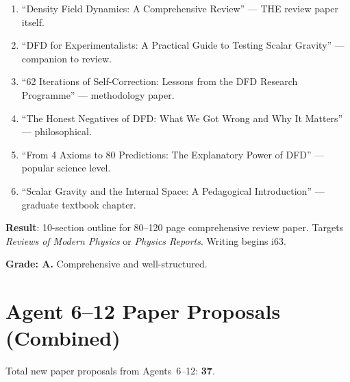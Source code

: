 \documentclass[11pt,a4paper]{article}
\begin{document}
\begin{enumerate}
\item ``Density Field Dynamics: A Comprehensive Review'' --- THE review paper itself.
\item ``DFD for Experimentalists: A Practical Guide to Testing Scalar Gravity'' --- companion to review.
\item ``62 Iterations of Self-Correction: Lessons from the DFD Research Programme'' --- methodology paper.
\item ``The Honest Negatives of DFD: What We Got Wrong and Why It Matters'' --- philosophical.
\item ``From 4 Axioms to 80 Predictions: The Explanatory Power of DFD'' --- popular science level.
\item ``Scalar Gravity and the Internal Space: A Pedagogical Introduction'' --- graduate textbook chapter.
\end{enumerate}

\begin{tcolorbox}[colback=blue!5!white, colframe=blue!60!black, title={Agent 12: Review Paper Outline COMPLETE}]
\textbf{Result}: 10-section outline for 80--120 page comprehensive review paper. Targets \textit{Reviews of Modern Physics} or \textit{Physics Reports}. Writing begins i63.

\textbf{Grade: A.} Comprehensive and well-structured.
\end{tcolorbox}


\section*{Agent 6--12 Paper Proposals (Combined)}

Total new paper proposals from Agents~6--12: \textbf{37}.
\end{document}
